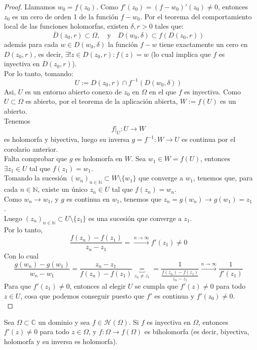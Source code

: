 \begin{proof}
    Llamamos $w_0 = f(z_0)$. Como $f'(z_0) = (f-w_0)'(z_0) \neq 0$, entonces $z_0$ es un cero de orden 1 de la función $f - w_0$. Por el teorema del comportamiento local de las funciones holomorfas, existen $\delta, r > 0$ tales que:
    \[
        \overline{D}(z_0,r) \subset \Omega, \quad \text{y} \quad D(w_0, \delta) \subset f(D(z_0,r))
    \]
    además para cada $w \in D(w_0, \delta)$ la función $f-w$ tiene exactamente un cero en $D(z_0,r)$, es decir, $\exists! z \in D(z_0,r) : f(z) = w$ (lo cual implica que $f$ es inyectiva en $D(z_0,r)$).\\
    Por lo tanto, tomando:
    \[
        U := D(z_0,r) \cap f^{-1}(D(w_0, \delta))
    \]
    Asi, $U$ es un entorno abierto conexo de $z_0$ en $\Omega$ en el que $f$ es inyectiva.
    Como $U \subset \Omega$ es abierto, por el teorema de la aplicación abierta, $W := f(U)$ es un abierto.\\
    Tenemos
    \[
        f |_U : U \to W
    \]
    es holomorfa y biyectiva, luego su inversa $g = f^{-1} : W \to U$ es continua por el corolario anterior.\\
    Falta comprobar que $g$ es holomorfa en $W$. Sea $w_1 \in W = f(U)$, entonces $\exists z_1 \in U$ tal que $f(z_1) = w_1$. \\
    Tomando la sucesión $(w_n)_{n \in \mathbb{N}} \subset W \setminus \{ w_1 \}$ que converge a $w_1$, tenemos que, para cada $n \in \mathbb{N}$, existe un único $z_n \in U$ tal que $f(z_n) = w_n$.\\
    Como $w_n \to w_1$, y $g$ es continua en $w_1$, tenemos que $z_n = g(w_n) \to g(w_1) = z_1$.\\
    Luego $(z_n)_{n \in \mathbb{N}} \subset U \setminus \{ z_1 \}$ es una sucesión que converge a $z_1$.\\
    Por lo tanto,
    \[
        \frac{f(z_n) - f(z_1)}{z_n - z_1} = \xrightarrow{n \to \infty} f'(z_1) \neq 0
    \]
    Con lo cual
    \[
        \frac{g(w_n) - g(w_1)}{w_n - w_1} = \frac{z_n - z_1}{f(z_n) - f(z_1)} \underbrace{=}_{z_n \neq z_1} = \frac{1}{\frac{f(z_n)-f(z_1)}{z_n-z_1}} \xrightarrow{n \to \infty} \frac{1}{f'(z_1)} 
    \]
    Para que $f'(z_1) \neq 0$, entonces al elegir $U$ se cumpla que $f'(z) \neq 0$ para todo $z \in U$, cosa que podemos conseguir puesto que $f'$ es continua y $f'(z_0) \neq 0$.\\
\end{proof}

\begin{corolario}
    Sea $\Omega \subset \mathbb{C}$ un dominio y sea $f \in \mathcal{H}(\Omega)$. Si $f$ es inyectiva en $\Omega$, entonces $f' (z) \neq 0$ para todo $z \in \Omega$, y $f : \Omega \to f(\Omega)$ es biholomorfa (es decir, biyectiva, holomorfa y su inversa es holomorfa).
\end{corolario}

